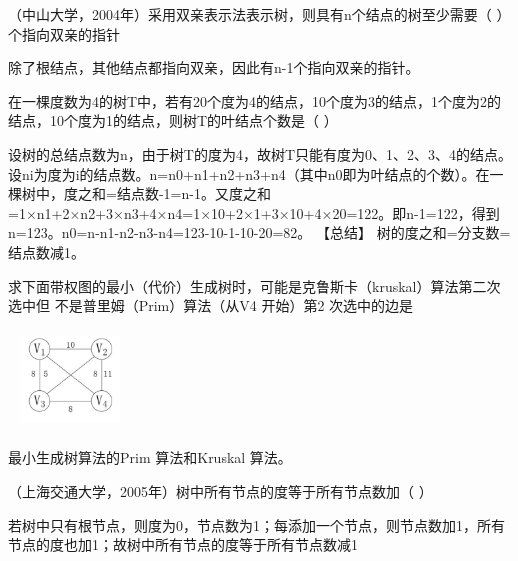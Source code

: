 \question （中山大学，2004年）采用双亲表示法表示树，则具有n个结点的树至少需要（
）个指向双亲的指针
\par{}
\begin{solution}除了根结点，其他结点都指向双亲，因此有n-1个指向双亲的指针。
\end{solution}
\question 在一棵度数为4的树T中，若有20个度为4的结点，10个度为3的结点，1个度为2的结点，10个度为1的结点，则树T的叶结点个数是（
）
\par{}
\begin{solution}设树的总结点数为n，由于树T的度为4，故树T只能有度为0、1、2、3、4的结点。设ni为度为i的结点数。n=n0+n1+n2+n3+n4（其中n0即为叶结点的个数）。在一棵树中，度之和=结点数-1=n-1。又度之和=1×n1+2×n2+3×n3+4×n4=1×10+2×1+3×10+4×20=122。即n-1=122，得到n=123。n0=n-n1-n2-n3-n4=123-10-1-10-20=82。
【总结】 树的度之和=分支数=结点数减1。
\end{solution}
\question 求下面带权图的最小（代价）生成树时，可能是克鲁斯卡（kruskal）算法第二次选中但
不是普里姆（Prim）算法（从V4 开始）第2 次选中的边是

~
\includegraphics[width=1.04167in,height=1.04167in]{computerassets/96705ACDEE416EAA788ED33A0F97461B.png}
\par{}
\begin{solution}最小生成树算法的Prim 算法和Kruskal 算法。
\end{solution}
\question （上海交通大学，2005年）树中所有节点的度等于所有节点数加（ ）
\par{}
\begin{solution}若树中只有根节点，则度为0，节点数为1；每添加一个节点，则节点数加1，所有节点的度也加1；故树中所有节点的度等于所有节点数减1
\end{solution}
